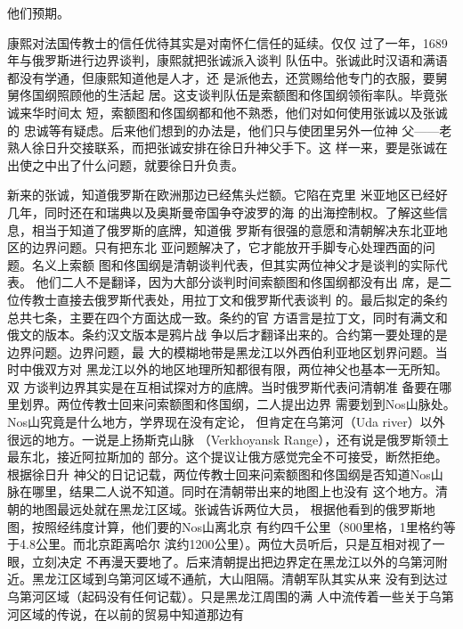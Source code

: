 他们预期。%
\par
康熙对法国传教士的信任优待其实是对南怀仁信任的延续。仅仅%
过了一年，1689年与俄罗斯进行边界谈判，康熙就把张诚派入谈判%
队伍中。张诚此时汉语和满语都没有学通，但康熙知道他是人才，还%
是派他去，还赏赐给他专门的衣服，要舅舅佟国纲照顾他的生活起%
居。这支谈判队伍是索额图和佟国纲领衔率队。毕竟张诚来华时间太%
短，索额图和佟国纲都和他不熟悉，他们对如何使用张诚以及张诚的%
忠诚等有疑虑。后来他们想到的办法是，他们只与使团里另外一位神%
父——老熟人徐日升交接联系，而把张诚安排在徐日升神父手下。这%
样一来，要是张诚在出使之中出了什么问题，就要徐日升负责。%
\par
新来的张诚，知道俄罗斯在欧洲那边已经焦头烂额。它陷在克里%
米亚地区已经好几年，同时还在和瑞典以及奥斯曼帝国争夺波罗的海%
的出海控制权。了解这些信息，相当于知道了俄罗斯的底牌，知道俄%
罗斯有很强的意愿和清朝解决东北亚地区的边界问题。只有把东北%
亚问题解决了，它才能放开手脚专心处理西面的问题。名义上索额%
图和佟国纲是清朝谈判代表，但其实两位神父才是谈判的实际代表。%
他们二人不是翻译，因为大部分谈判时间索额图和佟国纲都没有出%
席，是二位传教士直接去俄罗斯代表处，用拉丁文和俄罗斯代表谈判%
的。最后拟定的条约总共七条，主要在四个方面达成一致。条约的官%
方语言是拉丁文，同时有满文和俄文的版本。条约汉文版本是鸦片战%
争以后才翻译出来的。合约第一要处理的是边界问题。边界问题，最%
大的模糊地带是黑龙江以外西伯利亚地区划界问题。当时中俄双方对%
黑龙江以外的地区地理所知都很有限，两位神父也基本一无所知。双%
方谈判边界其实是在互相试探对方的底牌。当时俄罗斯代表问清朝准%
备要在哪里划界。两位传教士回来问索额图和佟国纲，二人提出边界%
需要划到Nos山脉处。Nos山究竟是什么地方，学界现在没有定论，%
但肯定在乌第河（Uda river）以外很远的地方。一说是上扬斯克山脉%
（Verkhoyansk Range），还有说是俄罗斯领土最东北，接近阿拉斯加的%
部分。这个提议让俄方感觉完全不可接受，断然拒绝。根据徐日升%
神父的日记记载，两位传教士回来问索额图和佟国纲是否知道Nos山%
脉在哪里，结果二人说不知道。同时在清朝带出来的地图上也没有%
这个地方。清朝的地图最远处就在黑龙江区域。张诚告诉两位大员，%
根据他看到的俄罗斯地图，按照经纬度计算，他们要的Nos山离北京%
有约四千公里（800里格，1里格约等于4.8公里。而北京距离哈尔%
滨约1200公里）。两位大员听后，只是互相对视了一眼，立刻决定%
不再漫天要地了。后来清朝提出把边界定在黑龙江以外的乌第河附%
近。黑龙江区域到乌第河区域不通航，大山阻隔。清朝军队其实从来%
没有到达过乌第河区域（起码没有任何记载）。只是黑龙江周围的满%
人中流传着一些关于乌第河区域的传说，在以前的贸易中知道那边有%
